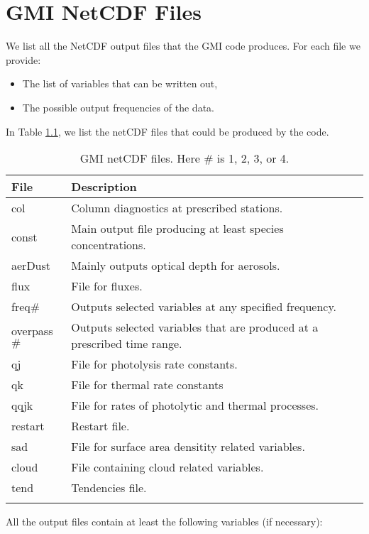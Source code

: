 \chapter[NetCDF Files]{GMI NetCDF Files} \label{chap:netcdf}
%
We list all the NetCDF output files that the GMI code produces.
For each file we provide:
\begin{itemize}
\item The list of variables that can be written out,
\item The possible output frequencies of the data.
\end{itemize}

%
In Table \ref{tab:net3}, we list the netCDF files that could be produced by the code.
%
\begin{center}
\begin{longtable}{|l|l|} \hline\hline
{\bf File}&  {\bf Description} \\ \hline\hline
col       &  Column diagnostics at prescribed stations.           \\
const    & Main output file producing at least species concentrations.   \\
aerDust   & Mainly outputs optical depth for aerosols. \\
flux      & File for fluxes.                \\
freq$\#$ & Outputs selected variables at any specified frequency.         \\
overpass$\#$ & Outputs selected variables that are produced at a prescribed time range.    \\
qj        &  File for photolysis rate constants.    \\
qk        &  File for thermal rate constants    \\
qqjk      &  File for rates of photolytic and thermal processes.     \\
restart   &  Restart file.      \\ 
sad       &  File for surface area densitity related variables.    \\
cloud     &  File containing cloud related variables. \\
tend      &  Tendencies file.     \\ \hline\hline
\caption{GMI netCDF files. Here $\#$ is 1, 2, 3, or 4.}
\label{tab:net3}
\end{longtable}
\end{center}
%
\noindent
All the output files contain at least the following variables (if necessary):
%
